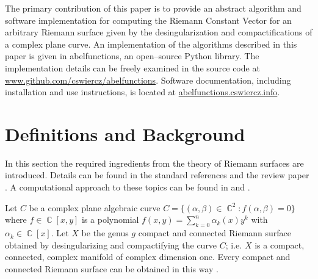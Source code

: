 \documentclass[12pt]{article}
\theoremstyle{definition}
\DeclareMathOperator{\CC}{\mathbb{C}}
\begin{document}
The primary contribution of this paper is to provide an abstract
algorithm and software implementation for computing the Riemann Constant
Vector for an arbitrary Riemann surface given by the desingularization
and compactifications of a complex plane curve. An implementation of the
algorithms described in this paper is given in {\sc abelfunctions}, an
open--source Python library. The implementation details can be freely
examined in the source code at
\url{www.github.com/cswiercz/abelfunctions}. Software documentation,
including installation and use instructions, is located at
\url{abelfunctions.cswiercz.info}.




\section{Definitions and Background}\label{sec:background}


In this section the required ingredients from the theory of Riemann
surfaces are introduced. Details can be found in the standard references
\cite{FarkasKra92,Springer57} and the review paper \cite{Dubrovin81}. A
computational approach to these topics can be found in
\cite{BobenkoKlein11,DeconinckPatterson11} and
\cite{DeconinckPatterson08}.

Let $C$ be a complex plane algebraic curve $C = \{(\alpha,\beta) \in
\CC^2 : f(\alpha,\beta) = 0\}$ where $f \in \CC[x,y]$ is a polynomial
$f(x,y) = \sum_{k=0}^n \alpha_k(x) y^k$ with $\alpha_k \in \CC[x]$. Let
$X$ be the genus $g$ compact and connected Riemann surface obtained by
desingularizing and compactifying the curve $C$; i.e. $X$ is a compact,
connected, complex manifold of complex dimension one. Every compact and
connected Riemann surface can be obtained in this way
\cite{Griffiths89}.
\end{document}
